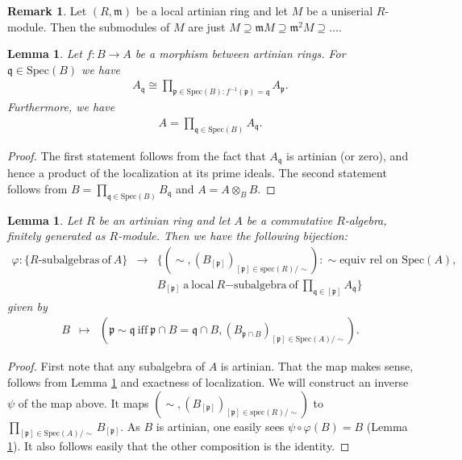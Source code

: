 \documentclass{amsart}
\theoremstyle{plain}
\newtheorem{lemma}[theorem]{Lemma}
\theoremstyle{definition}
\newtheorem{remark}[theorem]{Remark}
\begin{document}
\begin{remark} \label{133}
Let $(R,{\mathfrak{m}})$ be a local artinian ring and let $M$ be a uniserial $R$-module. Then the submodules of $M$ are just $M \supseteq {\mathfrak{m}} M \supseteq {\mathfrak{m}}^2 M
\supseteq \ldots$. 
\end{remark}

\begin{lemma} \label{93}
Let $f:B \to A$ be a morphism between artinian rings. For ${\mathfrak{q}} \in \mathrm{Spec}(B)$ we have 
\begin{eqnarray*}
A_{\mathfrak{q}} \cong \prod_{{\mathfrak{p}} \in \mathrm{Spec}(B): f^{-1}({\mathfrak{p}})={\mathfrak{q}}} A_{\mathfrak{p}}.
\end{eqnarray*}
Furthermore, we have 
\begin{eqnarray*}
A= \prod_{{\mathfrak{q}} \in \mathrm{Spec}(B)} A_{\mathfrak{q}}. 
\end{eqnarray*}
\end{lemma}
\begin{proof}
 The first statement follows from the fact that $A_{\mathfrak{q}}$ is artinian (or zero), and hence a product of the localization at its prime ideals. The second
statement follows from $B=\prod_{{\mathfrak{q}} \in \mathrm{Spec}(B)} B_{\mathfrak{q}}$ and $A=A \otimes_B B$. 
\end{proof}

\begin{lemma} \label{94}
 Let $R$ be an artinian ring and let $A$ be a commutative $R$-algebra, finitely generated as $R$-module. Then we have the following bijection:
\begin{eqnarray*}
\varphi: \{R\textrm{-}\mathrm{subalgebras\ of\ }A\} &\to& \{(\sim,(B_{[{\mathfrak{p}}]})_{[{\mathfrak{p}}] \in \mathrm{spec}(R)/\sim}): \sim \textrm{equiv rel on }\mathrm{Spec}(A), \\
&& B_{[{\mathfrak{p}}]} \mathrm{\ a\ local\ } R\mathrm{-subalgebra\ of\ }\prod_{{\mathfrak{q}} \in [{\mathfrak{p}}]} A_{\mathfrak{q}} \}
\end{eqnarray*}
given by
\begin{eqnarray*}
B &\mapsto& ( {\mathfrak{p}} \sim {\mathfrak{q}} \mathrm{\ iff\ }{\mathfrak{p}} \cap B={\mathfrak{q}} \cap B,  (B_{{\mathfrak{p}} \cap B})_{[{\mathfrak{p}}] \in \mathrm{Spec}(A)/\sim}).
\end{eqnarray*}
\end{lemma}
\begin{proof}
First note that any subalgebra of $A$ is artinian.
That the map makes sense, follows from Lemma \ref{93} and exactness of localization.
We will construct an inverse $\psi$ of the map above. It maps $(\sim,(B_{[{\mathfrak{p}}]})_{[{\mathfrak{p}}] \in \mathrm{spec}(R)/\sim})$ to $\prod_{[{\mathfrak{p}}] \in
\mathrm{Spec}(A)/\sim}  B_{[{\mathfrak{p}}]}$. As $B$ is artinian, one easily sees $\psi \circ \varphi(B)=B$ (Lemma \ref{93}). It also follows easily that the
other composition is the identity. 
\end{proof}
\end{document}
